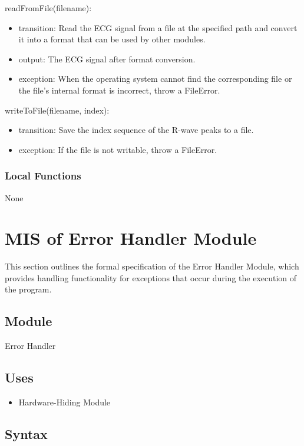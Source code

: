 \documentclass[12pt, titlepage]{article}
\begin{document}
\noindent readFromFile(filename):
\begin{itemize}
\item transition: Read the ECG signal from a file at the specified path and
convert it into a format that can be used by other modules.
\item output: The ECG signal after format conversion.
\item exception: When the operating system cannot find the corresponding file or
the file's internal format is incorrect, throw a FileError.
\end{itemize}

\noindent writeToFile(filename, index):
\begin{itemize}
\item transition: Save the index sequence of the R-wave peaks to a file.
\item exception: If the file is not writable, throw a FileError.
\end{itemize}

\subsubsection{Local Functions}

None

\newpage

\section{MIS of Error Handler Module} \label{MIS_ERROR}

This section outlines the formal specification of the Error Handler Module,
which provides handling functionality for exceptions that occur during the
execution of the program.

\subsection{Module}

Error Handler

\subsection{Uses}

\begin{itemize}
\item Hardware-Hiding Module
\end{itemize}

\subsection{Syntax}
\end{document}
